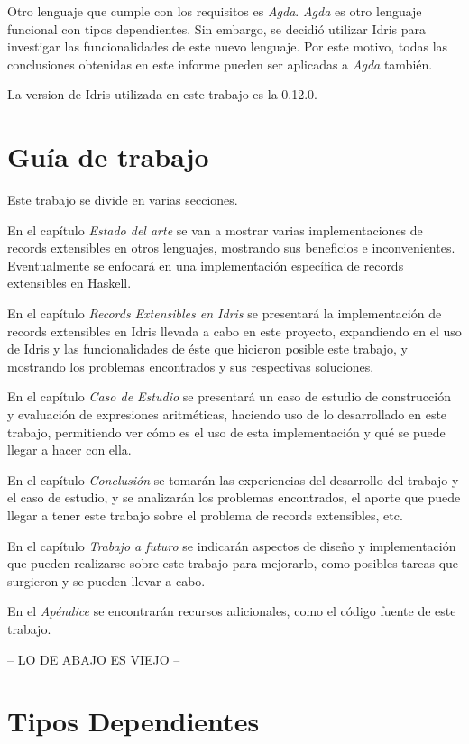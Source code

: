 Otro lenguaje que cumple con los requisitos es \textit{Agda}. \textit{Agda} \cite{Norell:2009:DTP:1481861.1481862} es otro lenguaje funcional con tipos dependientes. Sin embargo, se decidió utilizar Idris para investigar las funcionalidades de este nuevo lenguaje.
Por este motivo, todas las conclusiones obtenidas en este informe pueden ser aplicadas a \textit{Agda} también.

La version de Idris utilizada en este trabajo es la 0.12.0.

\section{Guía de trabajo}

Este trabajo se divide en varias secciones. 

En el capítulo \textit{Estado del arte} se van a mostrar varias implementaciones de records extensibles en otros lenguajes, mostrando sus beneficios e inconvenientes. Eventualmente se enfocará en una implementación específica de records extensibles en Haskell.

En el capítulo \textit{Records Extensibles en Idris} se presentará la implementación de records extensibles en Idris llevada a cabo en este proyecto, expandiendo en el uso de Idris y las funcionalidades de éste que hicieron posible este trabajo, y mostrando los problemas encontrados y sus respectivas soluciones.

En el capítulo \textit{Caso de Estudio} se presentará un caso de estudio de construcción y evaluación de expresiones aritméticas, haciendo uso de lo desarrollado en este trabajo, permitiendo ver cómo es el uso de esta implementación y qué se puede llegar a hacer con ella.

En el capítulo \textit{Conclusión} se tomarán las experiencias del desarrollo del trabajo y el caso de estudio, y se analizarán los problemas encontrados, el aporte que puede llegar a tener este trabajo sobre el problema de records extensibles, etc.

En el capítulo \textit{Trabajo a futuro} se indicarán aspectos de diseño y implementación que pueden realizarse sobre este trabajo para mejorarlo, como posibles tareas que surgieron y se pueden llevar a cabo.

En el \textit{Apéndice} se encontrarán recursos adicionales, como el código fuente de este trabajo.



-- LO DE ABAJO ES VIEJO --


\section{Tipos Dependientes}

